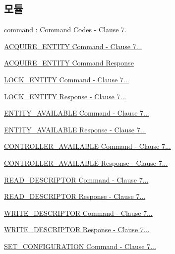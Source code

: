 \subsection*{모듈}
\begin{DoxyCompactItemize}
\item 
\hyperlink{group__command}{command \+: Command Codes -\/ Clause 7.}
\item 
\hyperlink{group__command__acquire__entity}{A\+C\+Q\+U\+I\+R\+E\+\_\+\+E\+N\+T\+I\+T\+Y Command -\/ Clause 7...}
\item 
\hyperlink{group__command__acquire__entity__response}{A\+C\+Q\+U\+I\+R\+E\+\_\+\+E\+N\+T\+I\+T\+Y Command Response}
\item 
\hyperlink{group__command__lock__entity}{L\+O\+C\+K\+\_\+\+E\+N\+T\+I\+T\+Y Command -\/ Clause 7...}
\item 
\hyperlink{group__command__lock__entity__response}{L\+O\+C\+K\+\_\+\+E\+N\+T\+I\+T\+Y Response -\/ Clause 7...}
\item 
\hyperlink{group__command__entity__available}{E\+N\+T\+I\+T\+Y\+\_\+\+A\+V\+A\+I\+L\+A\+B\+L\+E Command -\/ Clause 7...}
\item 
\hyperlink{group__command__entity__available__response}{E\+N\+T\+I\+T\+Y\+\_\+\+A\+V\+A\+I\+L\+A\+B\+L\+E Response -\/ Clause 7...}
\item 
\hyperlink{group__command__controller__available}{C\+O\+N\+T\+R\+O\+L\+L\+E\+R\+\_\+\+A\+V\+A\+I\+L\+A\+B\+L\+E Command -\/ Clause 7...}
\item 
\hyperlink{group__command__controller__available__response}{C\+O\+N\+T\+R\+O\+L\+L\+E\+R\+\_\+\+A\+V\+A\+I\+L\+A\+B\+L\+E Response -\/ Clause 7...}
\item 
\hyperlink{group__command__read__descriptor}{R\+E\+A\+D\+\_\+\+D\+E\+S\+C\+R\+I\+P\+T\+O\+R Command -\/ Clause 7...}
\item 
\hyperlink{group__command__read__descriptor__response}{R\+E\+A\+D\+\_\+\+D\+E\+S\+C\+R\+I\+P\+T\+O\+R Response -\/ Clause 7...}
\item 
\hyperlink{group__command__write__descriptor}{W\+R\+I\+T\+E\+\_\+\+D\+E\+S\+C\+R\+I\+P\+T\+O\+R Command -\/ Clause 7...}
\item 
\hyperlink{group__command__write__descriptor__response}{W\+R\+I\+T\+E\+\_\+\+D\+E\+S\+C\+R\+I\+P\+T\+O\+R Response -\/ Clause 7...}
\item 
\hyperlink{group__command__set__configuration}{S\+E\+T\+\_\+\+C\+O\+N\+F\+I\+G\+U\+R\+A\+T\+I\+O\+N Command -\/ Clause 7...}

\end{DoxyCompactItemize}
